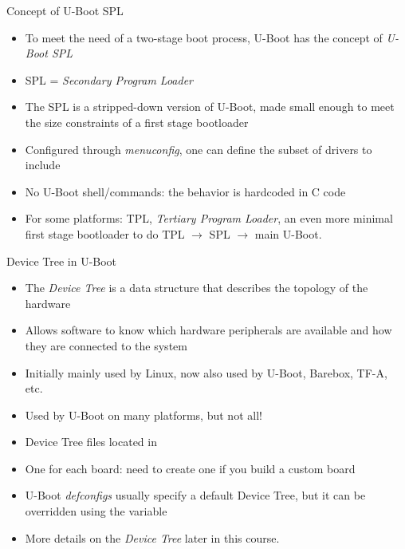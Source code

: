 \begin{frame}{Concept of U-Boot SPL}
  \begin{itemize}
  \item To meet the need of a two-stage boot process, U-Boot has the
    concept of {\em U-Boot SPL}
  \item SPL = {\em Secondary Program Loader}
  \item The SPL is a stripped-down version of U-Boot, made small
    enough to meet the size constraints of a first stage bootloader
  \item Configured through {\em menuconfig}, one can define the subset
    of drivers to include
  \item No U-Boot shell/commands: the behavior is hardcoded in C code
  \item For some platforms: TPL, {\em Tertiary Program Loader}, an
    even more minimal first stage bootloader to do TPL
    $\rightarrow$ SPL $\rightarrow$ main U-Boot.
  \end{itemize}
\end{frame}

\begin{frame}{Device Tree in U-Boot}
  \begin{itemize}
  \item The {\em Device Tree} is a data structure that describes the
    topology of the hardware
  \item Allows software to know which hardware peripherals are
    available and how they are connected to the system
  \item Initially mainly used by Linux, now also used by U-Boot,
    Barebox, TF-A, etc.
  \item Used by U-Boot on many platforms, but not all!
  \item Device Tree files located in 
  \item One  for each board: need to create one if you
    build a custom board
  \item U-Boot {\em defconfigs} usually specify a default Device Tree,
    but it can be overridden using the  variable
  \item More details on the {\em Device Tree} later in this course.
  \end{itemize}
\end{frame}

